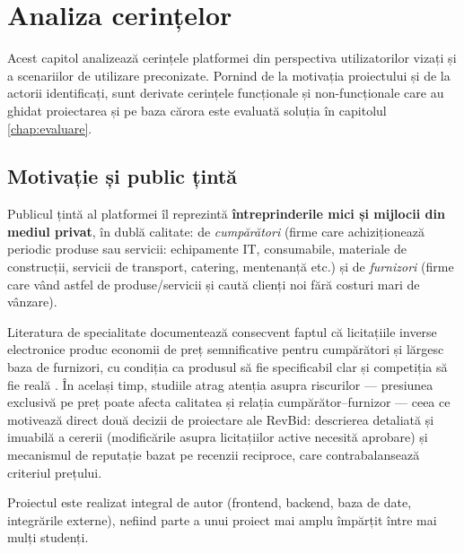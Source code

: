 \chapter{Analiza cerințelor}
\label{chap:cerinte}

Acest capitol analizează cerințele platformei din perspectiva utilizatorilor vizați și a scenariilor de utilizare preconizate. Pornind de la motivația proiectului și de la actorii identificați, sunt derivate cerințele funcționale și non-funcționale care au ghidat proiectarea și pe baza cărora este evaluată soluția în capitolul \ref{chap:evaluare}.

\section{Motivație și public țintă}

Publicul țintă al platformei îl reprezintă \textbf{întreprinderile mici și mijlocii din mediul privat}, în dublă calitate: de \textit{cumpărători} (firme care achiziționează periodic produse sau servicii: echipamente IT, consumabile, materiale de construcții, servicii de transport, catering, mentenanță etc.) și de \textit{furnizori} (firme care vând astfel de produse/servicii și caută clienți noi fără costuri mari de vânzare).

Literatura de specialitate documentează consecvent faptul că licitațiile inverse electronice produc economii de preț semnificative pentru cumpărători și lărgesc baza de furnizori, cu condiția ca produsul să fie specificabil clar și competiția să fie reală \cite{jap2002, smeltzer2003, carter2004}. În același timp, studiile atrag atenția asupra riscurilor --- presiunea exclusivă pe preț poate afecta calitatea și relația cumpărător--furnizor \cite{emiliani2000, jap2002} --- ceea ce motivează direct două decizii de proiectare ale RevBid: descrierea detaliată și imuabilă a cererii (modificările asupra licitațiilor active necesită aprobare) și mecanismul de reputație bazat pe recenzii reciproce, care contrabalansează criteriul prețului.


Proiectul este realizat integral de autor (frontend, backend, baza de date, integrările externe), nefiind parte a unui proiect mai amplu împărțit între mai mulți studenți.

